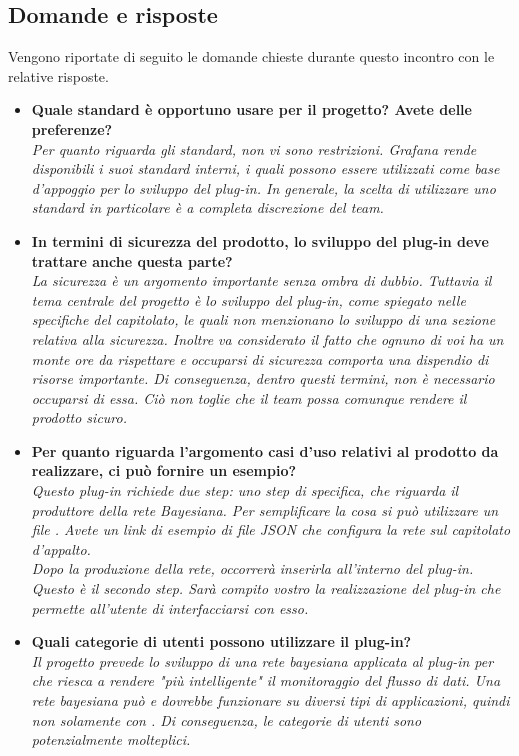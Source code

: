 \subsection{Domande e risposte}
Vengono riportate di seguito le domande chieste durante questo incontro con le relative risposte. 
\begin{itemize}
\item\textbf{Quale standard è opportuno usare per il progetto? Avete delle preferenze?}\\
\emph{Per quanto riguarda gli standard, non vi sono restrizioni.  Grafana rende disponibili i suoi standard interni, i quali possono essere utilizzati come base d'appoggio per lo sviluppo del plug-in. In generale, la scelta di utilizzare uno standard in particolare è a completa discrezione del team.}

\item\textbf{In termini di sicurezza del prodotto, lo sviluppo del plug-in deve trattare anche questa parte?}\\
\emph{La sicurezza è un argomento importante senza ombra di dubbio. Tuttavia il tema centrale del progetto è lo sviluppo del plug-in, come spiegato nelle specifiche del capitolato, le quali non menzionano lo sviluppo di una sezione relativa alla sicurezza. Inoltre va considerato il fatto che ognuno di voi ha un monte ore da rispettare e occuparsi di sicurezza comporta una dispendio di risorse importante. Di conseguenza, dentro questi termini, non è necessario occuparsi di essa. Ciò non toglie che il team possa comunque rendere il prodotto sicuro.}

\item\textbf{Per quanto riguarda l'argomento casi d'uso relativi al prodotto da realizzare, ci può fornire un esempio?}\\
\emph{Questo plug-in richiede due step: uno step di specifica, che riguarda il produttore della rete Bayesiana. Per semplificare la cosa si può utilizzare un file . Avete un link di esempio di file JSON che configura la rete sul capitolato d'appalto.\\
Dopo la produzione della rete, occorrerà inserirla all'interno del plug-in. Questo è il secondo step. Sarà compito vostro la realizzazione del plug-in che permette all'utente di interfacciarsi con esso. }
\item\textbf{Quali categorie di utenti possono utilizzare il plug-in?} \\
\emph{Il progetto prevede lo sviluppo di una rete bayesiana applicata al plug-in per  che riesca a rendere "più intelligente" il monitoraggio del flusso di dati. Una rete bayesiana può e dovrebbe funzionare su diversi tipi di applicazioni, quindi non solamente con . Di conseguenza, le categorie di utenti sono potenzialmente molteplici.}


\end{itemize}

